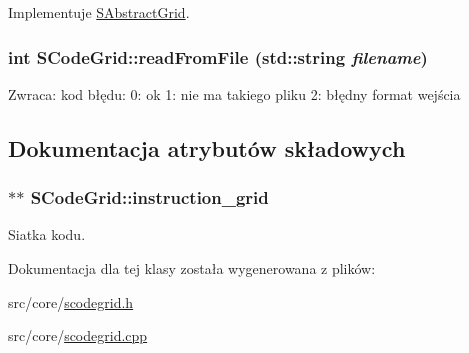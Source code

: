 Implementuje \hyperlink{classSAbstractGrid_d8772e08d58f970d885775cb9682bf6d}{SAbstractGrid}.\hypertarget{classSCodeGrid_46ed88ad7346788efb14c40cbd836981}{
\subsubsection[{readFromFile}]{\setlength{\rightskip}{0pt plus 5cm}int SCodeGrid::readFromFile (std::string {\em filename})}}
\label{classSCodeGrid_46ed88ad7346788efb14c40cbd836981}


\begin{Desc}
\item[Zwraca:]kod błędu: 0: ok 1: nie ma takiego pliku 2: błędny format wejścia \end{Desc}


\subsection{Dokumentacja atrybutów składowych}
\hypertarget{classSCodeGrid_445b4bd8cca6ddb7100afa621f5722b0}{
\subsubsection[{instruction\_\-grid}]{$\ast$$\ast$ {\bf SCodeGrid::instruction\_\-grid}}}
\label{classSCodeGrid_445b4bd8cca6ddb7100afa621f5722b0}


Siatka kodu. 

Dokumentacja dla tej klasy została wygenerowana z plików:\begin{CompactItemize}
\item 
src/core/\hyperlink{scodegrid_8h}{scodegrid.h}\item 
src/core/\hyperlink{scodegrid_8cpp}{scodegrid.cpp}\end{CompactItemize}

